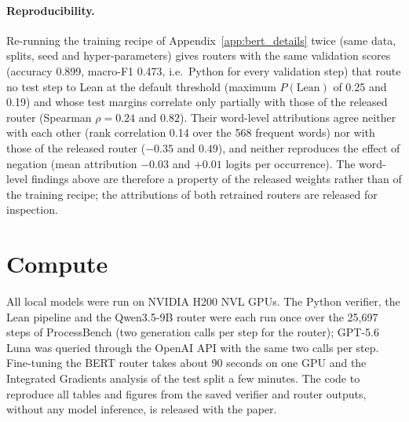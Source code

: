 \paragraph{Reproducibility.}
Re-running the training recipe of Appendix~\ref{app:bert_details} twice (same data, splits, seed and hyper-parameters) gives routers with the same validation scores (accuracy 0.899, macro-F1 0.473, i.e.\ Python for every validation step) that route no test step to Lean at the default threshold (maximum $P(\mathrm{Lean})$ of 0.25 and 0.19) and whose test margins correlate only partially with those of the released router (Spearman $\rho=0.24$ and $0.82$). Their word-level attributions agree neither with each other (rank correlation 0.14 over the 568 frequent words) nor with those of the released router ($-0.35$ and $0.49$), and neither reproduces the effect of negation (mean attribution $-0.03$ and $+0.01$ logits per occurrence). The word-level findings above are therefore a property of the released weights rather than of the training recipe; the attributions of both retrained routers are released for inspection.

\section{Compute}
\label{app:compute}
All local models were run on NVIDIA H200 NVL GPUs. The Python verifier, the Lean pipeline and the Qwen3.5-9B router were each run once over the 25,697 steps of ProcessBench (two generation calls per step for the router); GPT-5.6 Luna was queried through the OpenAI API with the same two calls per step. Fine-tuning the BERT router takes about 90 seconds on one GPU and the Integrated Gradients analysis of the test split a few minutes. The code to reproduce all tables and figures from the saved verifier and router outputs, without any model inference, is released with the paper.

